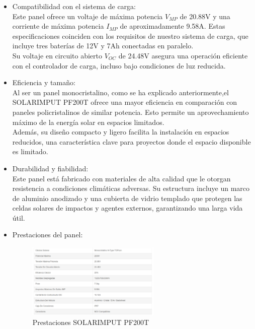 \begin{itemize}
    \item Compatibilidad con el sistema de carga: \\
    Este panel ofrece un voltaje de máxima potencia $V_{MP}$ de 20.88V y una corriente de máxima potencia $I_{MP}$  de aproximadamente 9.58A. Estas especificaciones coinciden con los requisitos de nuestro sistema de carga, que incluye tres baterías de 12V y 7Ah conectadas en paralelo. \\
    Su voltaje en circuito abierto $V_{OC}$  de 24.48V asegura una operación eficiente con el controlador de carga, incluso bajo condiciones de luz reducida.

    \item Eficiencia y tamaño: \\
    Al ser un panel monocristalino, como se ha explicado anteriormente,el SOLARIMPUT PF200T ofrece una mayor eficiencia en comparación con paneles policristalinos de similar potencia. Esto permite un aprovechamiento máximo de la energía solar en espacios limitados.\\
    Además, su diseño compacto y ligero facilita la instalación en espacios reducidos, una característica clave para proyectos donde el espacio disponible es limitado.

    \item Durabilidad y fiabilidad:\\
    Este panel está fabricado con materiales de alta calidad que le otorgan resistencia a condiciones climáticas adversas. Su estructura incluye un marco de aluminio anodizado y una cubierta de vidrio templado que protegen las celdas solares de impactos y agentes externos, garantizando una larga vida útil.

    \item Prestaciones del panel:
    \begin{figure}[H]
        \centering
        \includegraphics[width=0.6\textwidth]{images/2-hardware/Panel Solar/Caracteristicas.png}
        \caption{Prestaciones SOLARIMPUT PF200T}
        \label{fig:4-1-1-PanelSolar}
    \end{figure}
\end{itemize}

